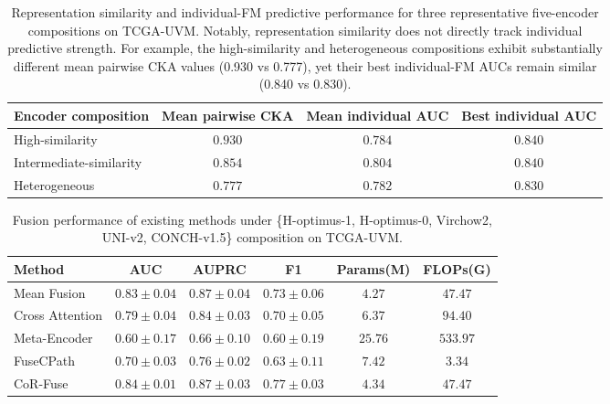 \begin{table}[!ht]
\centering
\caption{Representation similarity and individual-FM predictive performance for three representative five-encoder compositions on TCGA-UVM.
Notably, representation similarity does not directly track individual predictive strength.
For example, the high-similarity and heterogeneous compositions exhibit substantially different mean pairwise CKA values (0.930 vs 0.777), yet their best individual-FM AUCs remain similar (0.840 vs 0.830).}
\label{tab:composition_summary}
\begin{tabular}{lccc}
\toprule
Encoder composition & Mean pairwise CKA & Mean individual AUC & Best individual AUC \\
\midrule
High-similarity & $0.930 $ & $0.784$ & $0.840$ \\
Intermediate-similarity & $0.854 $ & $0.804$ & $0.840$ \\
Heterogeneous  & $0.777$ & $0.782 $ & $0.830$ \\
\bottomrule
\end{tabular}
\end{table}

\begin{table}[htbp]
\centering
\caption{Fusion performance of existing methods under \{H-optimus-1, H-optimus-0, Virchow2, UNI-v2, CONCH-v1.5\} composition on TCGA-UVM.}
\label{tab:uvm_existing_methods}
\begin{tabular}{lccccc}
\toprule
Method & AUC & AUPRC & F1 & Params(M) & FLOPs(G)\\
\midrule
Mean Fusion & $0.83 \pm 0.04$ & $0.87 \pm 0.04$ & $0.73 \pm 0.06$ & $4.27$ & $47.47$\\
Cross Attention & $0.79 \pm 0.04$ & $0.84 \pm 0.03$ & $0.70 \pm 0.05$ & $6.37$ & $94.40$\\
Meta-Encoder & $0.60 \pm 0.17$ & $0.66 \pm 0.10$ & $0.60 \pm 0.19$ & $25.76$ & $533.97$\\
FuseCPath & $0.70 \pm 0.03$ & $0.76 \pm 0.02$ & $0.63 \pm 0.11$ &$7.42$ &$3.34$\\
CoR-Fuse & $\mathbf{0.84 \pm 0.01}$ & $\mathbf{0.87 \pm 0.03}$ & $\mathbf{0.77 \pm 0.03}$ & $4.34$ & $47.47$\\
\bottomrule
\end{tabular}
\end{table}

